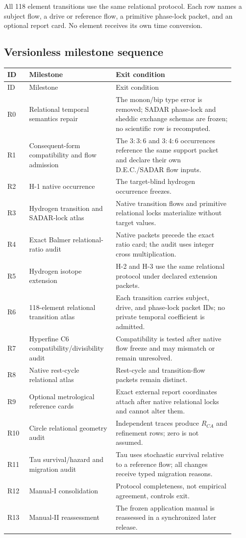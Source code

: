 All 118 element transitions use the same relational protocol.  Each row names
a subject flow, a drive or reference flow, a primitive phase-lock packet, and
an optional report card.  No element receives its own time conversion.

\subsection{Versionless milestone sequence}

\begin{longtable}{@{}p{0.09\linewidth}p{0.34\linewidth}p{0.49\linewidth}@{}}
\toprule
ID & Milestone & Exit condition \\
\midrule
\endfirsthead
\toprule
ID & Milestone & Exit condition \\
\midrule
\endhead
R0 & Relational temporal semantics repair & The monon/bip type error is removed; SADAR phase-lock and sheddic exchange schemas are frozen; no scientific row is recomputed. \\
R1 & Consequent-form compatibility and flow admission & The \(3{:}3{:}6\) and \(3{:}4{:}6\) occurrences reference the same support packet and declare their own D.E.C./SADAR flow inputs. \\
R2 & H-1 native occurrence & The target-blind hydrogen occurrence freezes. \\
R3 & Hydrogen transition and SADAR-lock atlas & Native transition flows and primitive relational locks materialize without target values. \\
R4 & Exact Balmer relational-ratio audit & Native packets precede the exact ratio card; the audit uses integer cross multiplication. \\
R5 & Hydrogen isotope extension & H-2 and H-3 use the same relational protocol under declared extension packets. \\
R6 & 118-element relational transition atlas & Each transition carries subject, drive, and phase-lock packet IDs; no private temporal coefficient is admitted. \\
R7 & Hyperfine C6 compatibility/divisibility audit & Compatibility is tested after native flow freeze and may mismatch or remain unresolved. \\
R8 & Native rest-cycle relational atlas & Rest-cycle and transition-flow packets remain distinct. \\
R9 & Optional metrological reference cards & Exact external report coordinates attach after native relational locks and cannot alter them. \\
R10 & Circle relational geometry audit & Independent traces produce \(R_{CA}\) and refinement rows; zero is not assumed. \\
R11 & Tau survival/hazard and migration audit & Tau uses stochastic survival relative to a reference flow; all changes receive typed migration reasons. \\
R12 & Manual-I consolidation & Protocol completeness, not empirical agreement, controls exit. \\
R13 & Manual-II reassessment & The frozen application manual is reassessed in a synchronized later release. \\
\bottomrule
\end{longtable}

